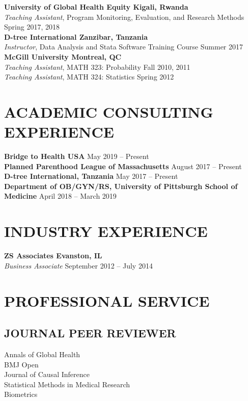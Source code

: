 \documentclass[12pt]{article}
\begin{document}
\textbf{University of Global Health Equity \hfill \hfill Kigali, Rwanda} \\
\textit{Teaching Assistant}, Program Monitoring, Evaluation, and Research Methods  \hfill \hfill Spring 2017, 2018 \\

\textbf{D-tree International \hfill \hfill Zanzibar, Tanzania}\\
\textit{Instructor}, Data Analysis and Stata Software Training Course \hfill \hfill Summer 2017  \\

\textbf{McGill University \hfill \hfill Montreal, QC}\\
\textit{Teaching Assistant}, MATH 323: Probability \hfill \hfill Fall 2010, 2011 \\
\textit{Teaching Assistant}, MATH 324: Statistics \hfill \hfill Spring 2012 

\section*{\textbf{{\large A}{CADEMIC} {\large C}{ONSULTING} {\large E}{XPERIENCE}}}
\textbf{Bridge to Health USA \hfill \hfill }May 2019 -- Present  \\
\textbf{Planned Parenthood League of Massachusetts \hfill \hfill }August 2017 -- Present  \\
\textbf{D-tree International, Tanzania \hfill \hfill }May 2017 -- Present \\
\textbf{Department of OB/GYN/RS, University of Pittsburgh School of Medicine  \hfill \hfill }April 2018 -- March 2019 

\section*{\textbf{{\large I}{NDUSTRY} {\large E}{XPERIENCE}}}
\textbf{ZS Associates \hfill \hfill Evanston, IL} \\
\textit{Business Associate} \hfill \hfill September 2012 -- July 2014 

\section*{\textbf{{\large P}{ROFESSIONAL} {\large S}{ERVICE}}}
\subsection*{\textbf{JOURNAL PEER REVIEWER}}
Annals of Global Health \\ 
BMJ Open \\ 
Journal of Causal Inference \\ 
Statistical Methods in Medical Research \\
Biometrics 
\end{document}
